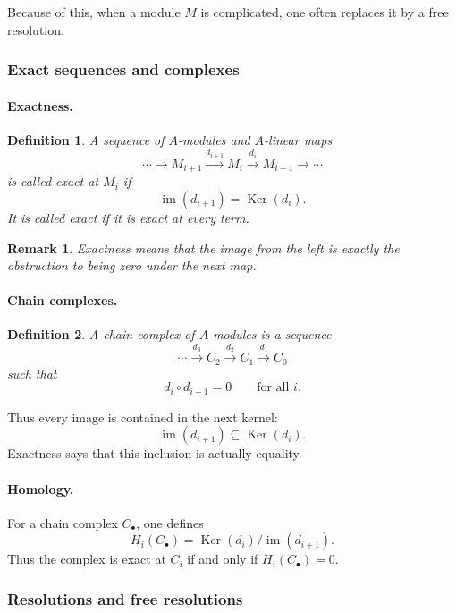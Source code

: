 \documentclass[12pt,a4paper]{article}
\theoremstyle{notespace}
\newtheorem{definition}{Definition}[section]
\newtheorem{remark}{Remark}[section]
\DeclareMathOperator{\im}{im}
\newcommand{\kerf}{\operatorname{Ker}}
\begin{document}
Because of this, when a module \(M\) is complicated, one often replaces it by a free resolution.

\subsubsection{Exact sequences and complexes}

\paragraph{Exactness.}

\begin{definition}
	A sequence of \(A\)-modules and \(A\)-linear maps
	\[
	\cdots \longrightarrow M_{i+1} \xrightarrow{d_{i+1}} M_i \xrightarrow{d_i} M_{i-1} \longrightarrow \cdots
	\]
	is called \emph{exact at \(M_i\)} if
	\[
	\im(d_{i+1})=\kerf(d_i).
	\]
	It is called \emph{exact} if it is exact at every term.
\end{definition}

\begin{remark}
	Exactness means that the image from the left is exactly the obstruction to being zero under the next map.
\end{remark}

\paragraph{Chain complexes.}

\begin{definition}
	A \emph{chain complex} of \(A\)-modules is a sequence
	\[
	\cdots \xrightarrow{d_3} C_2 \xrightarrow{d_2} C_1 \xrightarrow{d_1} C_0
	\]
	such that
	\[
	d_i\circ d_{i+1}=0
	\qquad \text{for all } i.
	\]
\end{definition}

Thus every image is contained in the next kernel:
\[
\im(d_{i+1})\subseteq \kerf(d_i).
\]
Exactness says that this inclusion is actually equality.

\paragraph{Homology.}

For a chain complex \(C_\bullet\), one defines
\[
H_i(C_\bullet)=\kerf(d_i)/\im(d_{i+1}).
\]
Thus the complex is exact at \(C_i\) if and only if \(H_i(C_\bullet)=0\).

\subsubsection{Resolutions and free resolutions}
\end{document}
